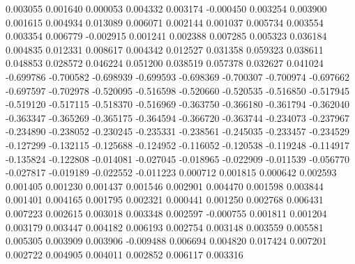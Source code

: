 0.003055
0.001640
0.000053
0.004332
0.003174
-0.000450
0.003254
0.003900
0.001615
0.004934
0.013089
0.006071
0.002144
0.001037
0.005734
0.003554
0.003354
0.006779
-0.002915
0.001241
0.002388
0.007285
0.005323
0.036184
0.004835
0.012331
0.008617
0.004342
0.012527
0.031358
0.059323
0.038611
0.048853
0.028572
0.046224
0.051200
0.038519
0.057378
0.032627
0.041024
-0.699786
-0.700582
-0.698939
-0.699593
-0.698369
-0.700307
-0.700974
-0.697662
-0.697597
-0.702978
-0.520095
-0.516598
-0.520660
-0.520535
-0.516850
-0.517945
-0.519120
-0.517115
-0.518370
-0.516969
-0.363750
-0.366180
-0.361794
-0.362040
-0.363347
-0.365269
-0.365175
-0.364594
-0.366720
-0.363744
-0.234073
-0.237967
-0.234890
-0.238052
-0.230245
-0.235331
-0.238561
-0.245035
-0.233457
-0.234529
-0.127299
-0.132115
-0.125688
-0.124952
-0.116052
-0.120538
-0.119248
-0.114917
-0.135824
-0.122808
-0.014081
-0.027045
-0.018965
-0.022909
-0.011539
-0.056770
-0.027817
-0.019189
-0.022552
-0.011223
0.000712
0.001815
0.000642
0.002593
0.001405
0.001230
0.001437
0.001546
0.002901
0.004470
0.001598
0.003844
0.001401
0.004165
0.001795
0.002321
0.000441
0.001250
0.002768
0.006431
0.007223
0.002615
0.003018
0.003348
0.002597
-0.000755
0.001811
0.001204
0.003179
0.003447
0.004182
0.006193
0.002754
0.003148
0.003559
0.005581
0.005305
0.003909
0.003906
-0.009488
0.006694
0.004820
0.017424
0.007201
0.002722
0.004905
0.004011
0.002852
0.006117
0.003316
